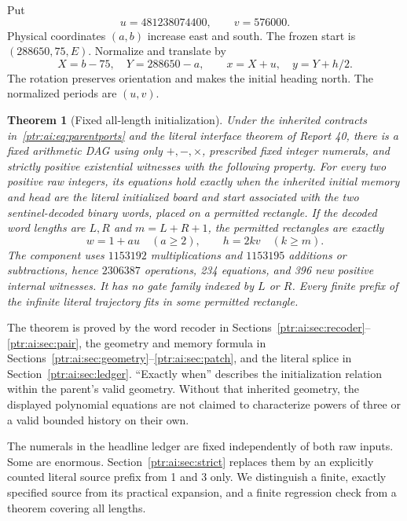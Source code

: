 \documentclass[11pt,letterpaper]{article}
\newtheorem{theorem}{Theorem}[section]
\theoremstyle{definition}\newtheorem{definition}[theorem]{Definition}
\theoremstyle{remark}\newtheorem{remark}[theorem]{Remark}
\begin{document}
Put
\begin{equation}\label{ptr:ai:eq:periods}
 u=481238074400,\qquad v=576000.
\end{equation}
Physical coordinates $(a,b)$ increase east and south. The frozen start is $(288650,75,E)$. Normalize and translate by
\begin{equation}\label{ptr:ai:eq:coordinates}
 X=b-75,\quad Y=288650-a,\qquad x=X+u,\quad y=Y+h/2.
\end{equation}
The rotation preserves orientation and makes the initial heading north. The normalized periods are $(u,v)$.

\begin{theorem}[Fixed all-length initialization]\label{ptr:ai:thm:main}
Under the inherited contracts in~\eqref{ptr:ai:eq:parentports} and the literal interface theorem of Report 40, there is a fixed arithmetic DAG using only $+,-,\times$, prescribed fixed integer numerals, and strictly positive existential witnesses with the following property. For every two positive raw integers, its equations hold exactly when the inherited initial memory and head are the literal initialized board and start associated with the two sentinel-decoded binary words, placed on a permitted rectangle. If the decoded word lengths are $L,R$ and $m=L+R+1$, the permitted rectangles are exactly
\[
 w=1+au\quad(a\ge2),\qquad h=2kv\quad(k\ge m).
\]
The component uses $1153192$ multiplications and $1153195$ additions or subtractions, hence $2306387$ operations, 234 equations, and 396 new positive internal witnesses. It has no gate family indexed by $L$ or $R$. Every finite prefix of the infinite literal trajectory fits in some permitted rectangle.
\end{theorem}
The theorem is proved by the word recoder in Sections~\ref{ptr:ai:sec:recoder}--\ref{ptr:ai:sec:pair}, the geometry and memory formula in Sections~\ref{ptr:ai:sec:geometry}--\ref{ptr:ai:sec:patch}, and the literal splice in Section~\ref{ptr:ai:sec:ledger}. ``Exactly when'' describes the initialization relation within the parent's valid geometry. Without that inherited geometry, the displayed polynomial equations are not claimed to characterize powers of three or a valid bounded history on their own.

The numerals in the headline ledger are fixed independently of both raw inputs. Some are enormous. Section~\ref{ptr:ai:sec:strict} replaces them by an explicitly counted literal source prefix from 1 and 3 only. We distinguish a finite, exactly specified source from its practical expansion, and a finite regression check from a theorem covering all lengths.
\end{document}

